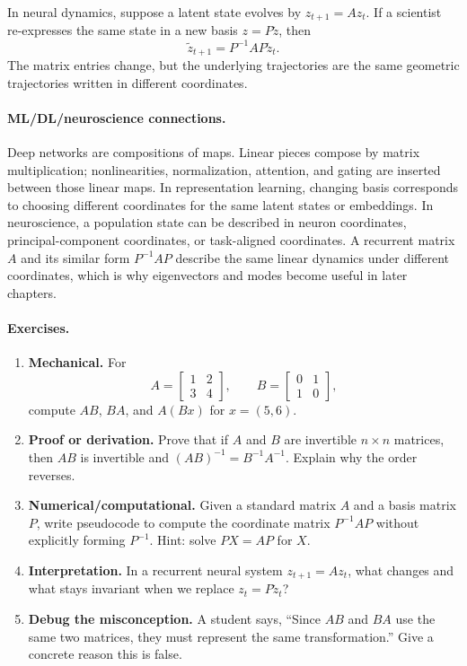 In neural dynamics, suppose a latent state evolves by \(z_{t+1}=Az_t\). If a scientist re-expresses the same state in a new basis \(z=P\tilde z\), then
\[
\tilde z_{t+1}=P^{-1}AP\tilde z_t.
\]
The matrix entries change, but the underlying trajectories are the same geometric trajectories written in different coordinates.

\paragraph{ML/DL/neuroscience connections.}
Deep networks are compositions of maps. Linear pieces compose by matrix multiplication; nonlinearities, normalization, attention, and gating are inserted between those linear maps. In representation learning, changing basis corresponds to choosing different coordinates for the same latent states or embeddings. In neuroscience, a population state can be described in neuron coordinates, principal-component coordinates, or task-aligned coordinates. A recurrent matrix \(A\) and its similar form \(P^{-1}AP\) describe the same linear dynamics under different coordinates, which is why eigenvectors and modes become useful in later chapters.

\paragraph{Exercises.}
\begin{enumerate}[label=\textbf{4.2.\arabic*.}, leftmargin=*]
\item \textbf{Mechanical.} For
\[
A=\begin{bmatrix}1&2\\3&4\end{bmatrix},
\qquad
B=\begin{bmatrix}0&1\\1&0\end{bmatrix},
\]
compute \(AB\), \(BA\), and \(A(Bx)\) for \(x=(5,6)\).
\item \textbf{Proof or derivation.} Prove that if \(A\) and \(B\) are invertible \(n\times n\) matrices, then \(AB\) is invertible and \((AB)^{-1}=B^{-1}A^{-1}\). Explain why the order reverses.
\item \textbf{Numerical/computational.} Given a standard matrix \(A\) and a basis matrix \(P\), write pseudocode to compute the coordinate matrix \(P^{-1}AP\) without explicitly forming \(P^{-1}\). Hint: solve \(PX=AP\) for \(X\).
\item \textbf{Interpretation.} In a recurrent neural system \(z_{t+1}=Az_t\), what changes and what stays invariant when we replace \(z_t=P\tilde z_t\)?
\item \textbf{Debug the misconception.} A student says, ``Since \(AB\) and \(BA\) use the same two matrices, they must represent the same transformation.'' Give a concrete reason this is false.
\end{enumerate}

